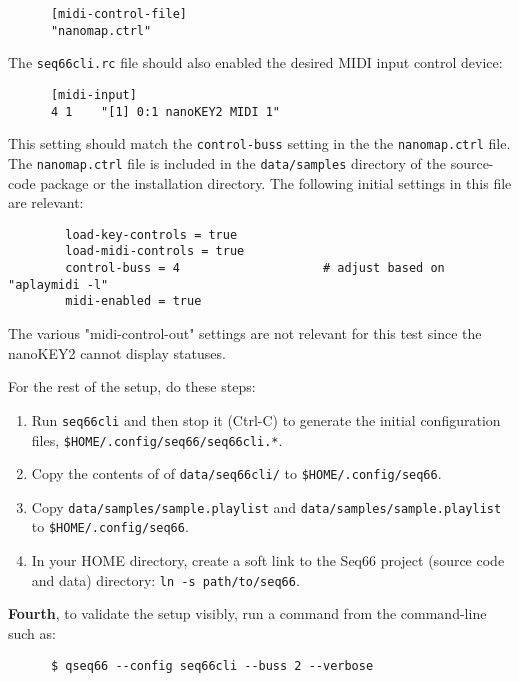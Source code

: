    \begin{verbatim}
      [midi-control-file]
      "nanomap.ctrl"
   \end{verbatim}

   The \texttt{seq66cli.rc} file should also enabled the desired MIDI input
   control device:

   \begin{verbatim}
      [midi-input]
      4 1    "[1] 0:1 nanoKEY2 MIDI 1"
   \end{verbatim}

   This setting should match the \texttt{control-buss} setting in the
   the \texttt{nanomap.ctrl} file.  The \texttt{nanomap.ctrl} file is included
   in the \texttt{data/samples} directory of the source-code package or the
   installation directory.  The following initial settings in this file are
   relevant:

   \begin{verbatim}
		load-key-controls = true
		load-midi-controls = true
		control-buss = 4					# adjust based on "aplaymidi -l"
		midi-enabled = true
   \end{verbatim}

   The various "midi-control-out" settings are not relevant for this test since
   the nanoKEY2 cannot display statuses.

   For the rest of the setup, do these steps:

   \begin{enumerate}
      \item Run \texttt{seq66cli} and then stop it (Ctrl-C) to generate the
         initial configuration files,
         \texttt{\$HOME/.config/seq66/seq66cli.*}.
      \item Copy the contents of of \texttt{data/seq66cli/} to
         \texttt{\$HOME/.config/seq66}.
      \item Copy \texttt{data/samples/sample.playlist} and
         \texttt{data/samples/sample.playlist} to
         \texttt{\$HOME/.config/seq66}.
      \item In your HOME directory, create a soft link to the Seq66 project
         (source code and data) directory: \texttt{ln -s path/to/seq66}.
   \end{enumerate}

   \textbf{Fourth}, to validate the setup visibly, run a command from the
   command-line such as:

   \begin{verbatim}
      $ qseq66 --config seq66cli --buss 2 --verbose
   \end{verbatim}

